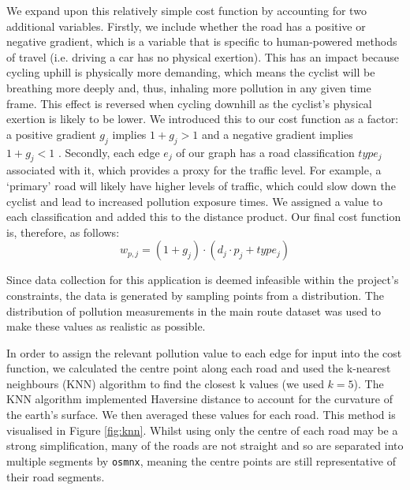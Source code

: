 \documentclass[11pt]{report}
\begin{document}
We expand upon this relatively simple cost function by accounting for two additional variables. Firstly, we include whether the road has a positive or negative gradient, which is a variable that is specific to human-powered methods of travel (i.e. driving a car has no physical exertion). This has an impact because cycling uphill is physically more demanding, which means the cyclist will be breathing more deeply and, thus, inhaling more pollution in any given time frame. This effect is reversed when cycling downhill as the cyclist's physical exertion is likely to be lower. We introduced this to our cost function as a factor: a positive gradient $g_j$ implies $1 + g_j > 1$ and a negative gradient implies $1 + g_j < 1$ . Secondly, each edge $e_j$ of our graph has a road classification $type_j$ associated with it, which provides a proxy for the traffic level. For example, a `primary' road will likely have higher levels of traffic, which could slow down the cyclist and lead to increased pollution exposure times. We assigned a value to each classification and added this to the distance product. Our final cost function is, therefore, as follows:
\begin{equation}
w_{p, j} = (1 + g_j) \cdot (d_j \cdot p_j + type_j)
\end{equation}


Since data collection for this application is deemed infeasible within the project's constraints, the data is generated by sampling points from a distribution. The distribution of pollution measurements in the main route dataset was used to make these values as realistic as possible.

In order to assign the relevant pollution value to each edge for input into the cost function, we calculated the centre point along each road and used the k-nearest neighbours (KNN) algorithm to find the closest k values (we used $k=5$). The KNN algorithm implemented Haversine distance to account for the curvature of the earth's surface. We then averaged these values for each road. This method is visualised in Figure \ref{fig:knn}. Whilst using only the centre of each road may be a strong simplification, many of the roads are not straight and so are separated into multiple segments by \texttt{osmnx}, meaning the centre points are still representative of their road segments.
\end{document}
